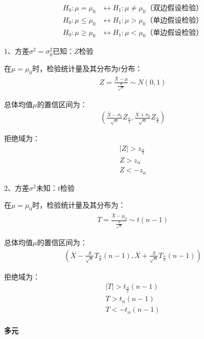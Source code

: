 \documentclass[12pt]{book}
\begin{document}
\begin{align*}
    H_0: \mu = \mu_0    & \leftrightarrow  	H_1: \mu \neq  \mu_0 \text{（双边假设检验）} \\
    H_0: \mu \leq \mu_0 & \leftrightarrow  	H_1: \mu > \mu_0 \text{（单边假设检验）}     \\
    H_0: \mu \geq \mu_0 & \leftrightarrow  	H_1: \mu < \mu_0 \text{（单边假设检验）}
\end{align*}


1、方差$\sigma^2 = \sigma^2_0$已知：$Z$检验

在$\mu = \mu_0$时，检验统计量及其分布为$t$分布：
\begin{gather*}
    Z=\frac{\overline{X}-\mu}{\frac{\sigma}{\sqrt{n}}}\sim N(0,1)
\end{gather*}


总体均值$\mu$的置信区间为：
\begin{gather*}
    \left(\frac{\overline{X}-\sigma_0}{\sqrt{n}}Z_{\frac{\alpha}{2}}, \frac{\overline{X}+\sigma_0}{\sqrt{n}}Z_{\frac{\alpha}{2}} \right)
\end{gather*}


拒绝域为：
\begin{gather*}
    \left|Z\right|>z_{\frac{\alpha}{2}} \\
    Z >  z_\alpha\\
    Z < -z_\alpha
\end{gather*}


2、方差$\sigma^2$未知：$t$检验

在$\mu = \mu_0$时，检验统计量及其分布为：
\begin{gather*}
    T=\frac{\overline{X}-\mu_0}{\frac{S}{\sqrt{n}}}\sim t(n-1)
\end{gather*}


总体均值$\mu$的置信区间为：
\begin{gather*}
    \left( \overline{X}-\frac{S}{\sqrt{n}}T_{\frac{\alpha}{2}}(n-1), \overline{X}+\frac{S}{\sqrt{n}}T_{\frac{\alpha}{2}}(n-1) \right)
\end{gather*}


拒绝域为：
\begin{gather*}
    \left|T\right|>t_{\frac{\alpha}{2}}\left(n-1\right) \\
    T>t_\alpha\left(n-1\right) \\
    T<-t_\alpha\left(n-1\right)
\end{gather*}


\paragraph{多元}
\end{document}

